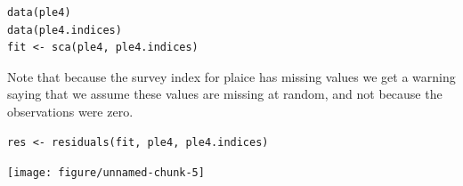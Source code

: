 \documentclass[a4paper,english,10pt]{article}\usepackage[]{graphicx}\usepackage[]{color}
\makeatletter
\newenvironment{kframe}{%
 \def\at@end@of@kframe{}%
 \ifinner\ifhmode%
  \def\at@end@of@kframe{\end{minipage}}%
  \begin{minipage}{\columnwidth}%
 \fi\fi%
 \def\FrameCommand##1{\hskip\@totalleftmargin \hskip-\fboxsep
 \colorbox{shadecolor}{##1}\hskip-\fboxsep
     \hskip-\linewidth \hskip-\@totalleftmargin \hskip\columnwidth}%
 \MakeFramed {\advance\hsize-\width
   \@totalleftmargin\z@ \linewidth\hsize
   \@setminipage}}%
 {\par\unskip\endMakeFramed%
 \at@end@of@kframe}
\newenvironment{knitrout}{}{} %
\makeatother
\begin{document}
\begin{knitrout}
\color{fgcolor}\begin{kframe}
\begin{verbatim}
data(ple4)
data(ple4.indices)
fit <- sca(ple4, ple4.indices)
\end{verbatim}


{\ttfamily\noindent\itshape\color{messagecolor}{\#\# Note: The following observations are treated as being missing at random:\\\#\# 	\ \ \ \ \ \  fleet year age\\\#\# 	\ \ \ \ BTS-Isis 1997\ \  1\\\#\# 	\ \ \ \ BTS-Isis 1997\ \  2\\\#\# 	 BTS-Tridens 1997\ \  1\\\#\# 	 BTS-Tridens 1997\ \  2\\\#\# 	\ \ \ \ \ \ \ \  SNS 1997\ \  1\\\#\# 	\ \ \ \ \ \ \ \  SNS 1997\ \  2\\\#\# 	\ \ \ \ \ \ \ \  SNS 2003\ \  1\\\#\# 	\ \ \ \ \ \ \ \  SNS 2003\ \  2\\\#\# 	\ \ \ \ \ \ \ \  SNS 2003\ \  3\\\#\#\ \ \ \ \ \  Predictions will be made for missing observations.}}\end{kframe}
\end{knitrout}


Note that because the survey index for plaice has missing values we get a warning saying that we assume these values are missing at random, and not because the observations were zero.

\begin{knitrout}
\color{fgcolor}\begin{kframe}
\begin{verbatim}
res <- residuals(fit, ple4, ple4.indices)
\end{verbatim}
\end{kframe}
\end{knitrout}


\begin{knitrout}
\color{fgcolor}

{\centering \texttt{[image: figure/unnamed-chunk-5]} 

}



\end{knitrout}
\end{document}
